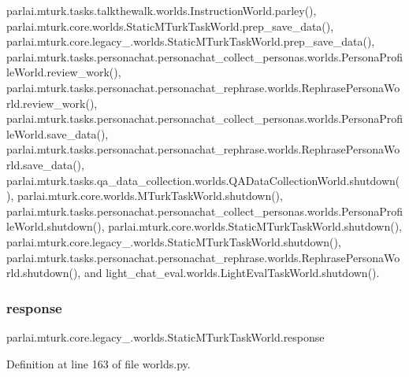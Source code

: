 parlai.\+mturk.\+tasks.\+talkthewalk.\+worlds.\+Instruction\+World.\+parley(), parlai.\+mturk.\+core.\+worlds.\+Static\+M\+Turk\+Task\+World.\+prep\+\_\+save\+\_\+data(), parlai.\+mturk.\+core.\+legacy\+\_.\+worlds.\+Static\+M\+Turk\+Task\+World.\+prep\+\_\+save\+\_\+data(), parlai.\+mturk.\+tasks.\+personachat.\+personachat\+\_\+collect\+\_\+personas.\+worlds.\+Persona\+Profile\+World.\+review\+\_\+work(), parlai.\+mturk.\+tasks.\+personachat.\+personachat\+\_\+rephrase.\+worlds.\+Rephrase\+Persona\+World.\+review\+\_\+work(), parlai.\+mturk.\+tasks.\+personachat.\+personachat\+\_\+collect\+\_\+personas.\+worlds.\+Persona\+Profile\+World.\+save\+\_\+data(), parlai.\+mturk.\+tasks.\+personachat.\+personachat\+\_\+rephrase.\+worlds.\+Rephrase\+Persona\+World.\+save\+\_\+data(), parlai.\+mturk.\+tasks.\+qa\+\_\+data\+\_\+collection.\+worlds.\+Q\+A\+Data\+Collection\+World.\+shutdown(), parlai.\+mturk.\+core.\+worlds.\+M\+Turk\+Task\+World.\+shutdown(), parlai.\+mturk.\+tasks.\+personachat.\+personachat\+\_\+collect\+\_\+personas.\+worlds.\+Persona\+Profile\+World.\+shutdown(), parlai.\+mturk.\+core.\+worlds.\+Static\+M\+Turk\+Task\+World.\+shutdown(), parlai.\+mturk.\+core.\+legacy\+\_.\+worlds.\+Static\+M\+Turk\+Task\+World.\+shutdown(), parlai.\+mturk.\+tasks.\+personachat.\+personachat\+\_\+rephrase.\+worlds.\+Rephrase\+Persona\+World.\+shutdown(), and light\+\_\+chat\+\_\+eval.\+worlds.\+Light\+Eval\+Task\+World.\+shutdown().

\mbox{\label{classparlai_1_1mturk_1_1core_1_1legacy__2018_1_1worlds_1_1StaticMTurkTaskWorld_ad58aef0c2b48ff7a682082b81d4f25ae}} 
\subsubsection{\texorpdfstring{response}{response}}
{\footnotesize\ttfamily parlai.\+mturk.\+core.\+legacy\+\_.\+worlds.\+Static\+M\+Turk\+Task\+World.\+response}



Definition at line 163 of file worlds.\+py.



